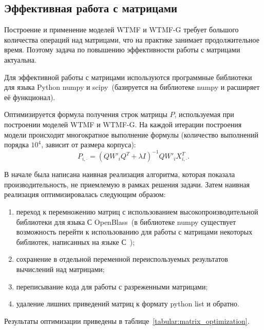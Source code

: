 
\subsection{Эффективная работа с матрицами}
    Построение и применение моделей WTMF и WTMF-G требует большого количества операций над матрицами, что на практике занимает продолжительное время.
    Поэтому задача по повышению эффективности работы с матрицами актуальна.

    Для эффективной работы с матрицами используются программные библиотеки для языка Python numpy и
    scipy~(базируется на библиотеке numpy и расширяет её функционал).

    Оптимизируется формула получения строк матрицы $P$, используемая при построении моделей WTMF и WTMF-G.
    На каждой итерации построения модели происходит многократное выполнение формулы (количество выполнений порядка $10^4$, зависит от размера корпуса):
    $$P_{i, \cdot} = (Q W'_i Q^T + \lambda I)^{-1} Q W'_i X_{i,\cdot}^T.$$

    В начале была написана наивная реализация алгоритма, которая показала производительность, не приемлемую в рамках решения задачи.
    Затем наивная реализация оптимизировалась следующим образом:
    \begin{enumerate}
        \item переход к перемножению матриц с использованием высокопроизводительной библиотеки для языка С OpenBlass~(в библиотеке numpy существует возможность перейти к использованию для работы с матрицами некоторых библиотек, написанных на языке С~\cite{blas_installation});
        \item сохранение в отдельной переменной переиспользуемых результатов вычислений над матрицами;
        \item переписывание кода для работы с разреженными матрицами;
        \item удаление лишних приведений матриц к формату python list и обратно.
    \end{enumerate}
    Результаты оптимизации приведены в таблице~\ref{tabular:matrix_optimization}.

